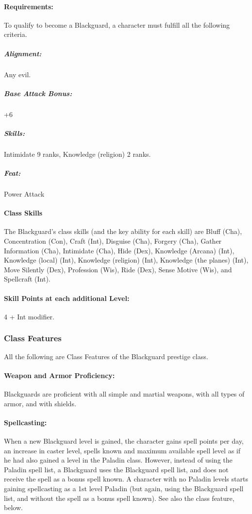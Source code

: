 \paragraph{Requirements:}
To qualify to become a Blackguard, a character must fulfill all the following criteria.
\subparagraph{Alignment:} Any evil.
\subparagraph{Base Attack Bonus:} +6
\subparagraph{Skills:} Intimidate 9 ranks, Knowledge (religion) 2 ranks.
\subparagraph{Feat:} Power Attack
\paragraph{Class Skills}
The Blackguard's class skills (and the key ability for each skill) are Bluff (Cha), Concentration (Con), Craft (Int), Disguise (Cha), Forgery (Cha), Gather Information (Cha), Intimidate (Cha), Hide (Dex), Knowledge (Arcana) (Int), Knowledge (local) (Int), Knowledge (religion) (Int), Knowledge (the planes) (Int), Move Silently (Dex), Profession (Wis), Ride (Dex), Sense Motive (Wis), and Spellcraft (Int).

\paragraph{Skill Points at each additional Level:} 4 + Int modifier. 

\subsubsection{Class Features}
All the following are Class Features of the Blackguard prestige class.

\paragraph{Weapon and Armor Proficiency:} Blackguards are proficient with all simple and martial weapons, with all types of armor, and with shields.

\paragraph{Spellcasting:} When a new Blackguard level is gained, the character gains spell points per day, an increase in caster level, spells known and maximum available spell level as if he had also gained a level in the Paladin class. However, instead of using the Paladin spell list, a Blackguard uses the Blackguard spell list, and does not receive the  spell as a bonus spell known. A character with no Paladin levels starts gaining spellcasting as a 1st level Paladin (but again, using the Blackguard spell list, and without the  spell as a bonus spell known). See also the  class feature, below.

